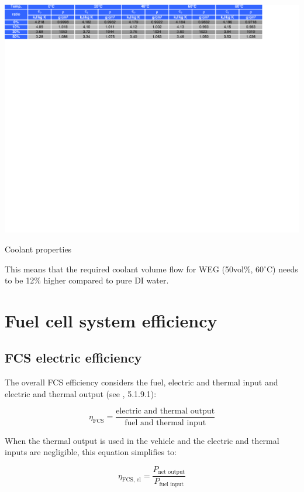\documentclass[11pt,a4paper,english,twoside]{scrreprt}
\begin{document}
\begin{table}
  \centering
  \includegraphics*[width=\textwidth,angle=0]{FCF_Table_coolant.pdf}
  \caption[Coolant properties]{Coolant properties}
  \label{tab:Coolant}
\end{table}

This means that the required coolant volume flow for WEG (50vol\%, 60$^\circ$C) needs to be 12\% higher compared to pure DI water.



\section{Fuel cell system efficiency}

\subsection{FCS electric efficiency}

The overall FCS efficiency considers the fuel, electric and thermal input and electric and thermal output (see \cite{SAEJ2615}, 5.1.9.1):

\[
\eta_\text{FCS} = \frac{\text{electric and thermal output}}{\text{fuel and thermal input}}
\]

When the thermal output is used in the vehicle and the electric and thermal inputs are negligible, this equation simplifies to:

\[
\eta_\text{FCS, el} = \frac{P_\text{net output}}{P_\text{fuel input}}
\]
\end{document}
